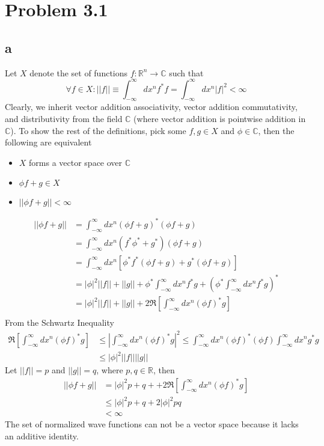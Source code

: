 \section*{Problem 3.1}
\subsection*{a}
Let $X$ denote the set of functions $f:\mathbb{R}^n\rightarrow\mathbb{C}$ such that
\begin{equation}
    \forall f \in X: ||f|| \equiv\int_{-\infty}^\infty dx^n f^\ast f = \int_{-\infty}^\infty dx^n|f|^2 < \infty
\end{equation}
Clearly, we inherit vector addition associativity, vector addition commutativity, and distributivity from the field $\mathbb{C}$ (where vector addition is pointwise addition in $\mathbb{C}$). To show the rest of the definitions, pick some $f,g \in X$ and $\phi \in \mathbb{C}$, then the following are equivalent
\begin{itemize}
    \item $X$ forms a vector space over $\mathbb{C}$
    \item $\phi f+g\in X$
    \item $||\phi f + g|| <\infty$
\end{itemize}
\begin{equation}
\begin{split}
    ||\phi f+g||
    &= \int_{-\infty}^\infty dx^n (\phi f+g)^\ast(\phi f + g)\\
    &= \int_{-\infty}^\infty dx^n (f^\ast\phi^\ast +g^\ast)(\phi f + g)\\
    &= \int_{-\infty}^\infty dx^n [\phi^\ast f^\ast(\phi f + g)+g^\ast(\phi f + g)]\\
    &= |\phi|^2||f||+||g||+\phi^\ast\int_{-\infty}^\infty dx^n f^\ast g +\left( \phi^\ast\int_{-\infty}^\infty dx^n f^\ast g \right)^\ast\\
    &= |\phi|^2||f||+||g||+2\Re\left[ \int_{-\infty}^\infty dx^n (\phi f)^\ast g\right] \\
\end{split}
\end{equation}
From the Schwartz Inequality
\begin{equation}
    \begin{split}
        \Re\left[ \int_{-\infty}^\infty dx^n (\phi f)^\ast g\right]
        &\leq |\int_{-\infty}^\infty dx^n (\phi f)^\ast g|^2 \leq \int_{-\infty}^\infty dx^n (\phi f)^\ast (\phi f)\int_{-\infty}^\infty dx^n g^\ast g\\
        &\leq |\phi|^2||f||||g||
    \end{split}
\end{equation}
Let $||f||=p$ and $||g||=q$, where $p,q \in \mathbb{R}$, then
\begin{equation}
    \begin{split}
        ||\phi f+g||
        &= |\phi|^2p+q++2\Re\left[ \int_{-\infty}^\infty dx^n (\phi f)^\ast g\right] \\
        &\leq |\phi|^2p+q+2|\phi|^2pq\\
        &<\infty
    \end{split}
\end{equation}
The set of normalized wave functions can not be a vector space because it lacks an additive identity.
